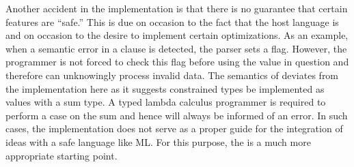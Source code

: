 
Another accident in the
\pads{} implementation is that there is no guarantee that
certain features are ``safe.''  This is due on occasion to the fact that
the \pads{} host language is \C{} and on occasion to the desire to implement
certain optimizations.  As an example, when a 
semantic error in a \Pwhere{} clause is detected, the parser sets a flag.  
However, the \C{} programmer is not forced to check this flag before using 
the value in question and therefore can unknowingly process invalid data.  The 
semantics of \ddc{} deviates from the \C{} implementation here as it suggests
constrained types be implemented as values with a sum type.  A typed lambda
calculus programmer is required to perform a case on the sum and
hence will always be informed of an error.
In such cases, the \C{} implementation does not serve as a
proper guide for the integration of \pads{} ideas with a safe 
language like ML.
For this purpose, the \ddc{} is a much more appropriate starting point.






